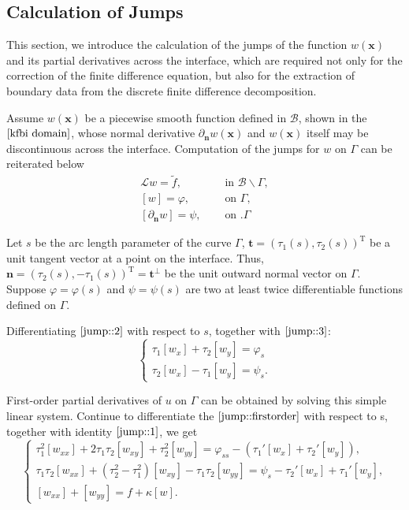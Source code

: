 \documentclass{article}
\begin{document}
\subsection{Calculation of Jumps}\label{appen:jumps}
This section, we introduce the calculation of the jumps of the function $w(\mathbf{x})$ and its partial derivatives across the interface, 
 which are required not only for the correction of the finite difference equation, but also for the extraction of boundary data from the discrete finite difference decomposition.
 
Assume $w(\mathbf{x})$ be a piecewise smooth function defined in $\mathcal{B}$, shown in the $\ref{kfbi domain}$, whose normal derivative $\partial_{\mathbf{n}} w(\mathbf{x})$ and $w(\mathbf{x})$ itself may be discontinuous across the interface. Computation of the jumps for $w$ on $\Gamma$ can be reiterated below
\begin{align}
\mathcal{L} w =\tilde{f}, & \quad \text { in }  \mathcal{B} \backslash \Gamma \label{jump::1},\\
[w] =\varphi, & \quad \text { on } \Gamma \label{jump::2},\\
\left[\partial_{\mathbf{n}}w\right] =\psi, & \quad \text { on } \label{jump::3}.\Gamma
\end{align}
\label{interface2}

Let $s$ be the arc length parameter of the curve $\Gamma$, $\mathbf{t}=(\tau_{1}(s), \tau_{2}(s))^{\mathrm{T}}$ be a unit tangent vector at a point on the interface. Thus, $\mathbf{n}=\left(\tau_{2}(s),-\tau_{1}(s)\right)^{\mathrm{T}}=\mathbf{t}^{\perp}$ be the unit outward normal vector on $\Gamma$. Suppose $\varphi = \varphi(s)$ and $\psi = \psi(s)$ are two at least twice differentiable functions defined on $\Gamma$.

Differentiating $\eqref{jump::2}$ with respect to $s$, together with $\eqref{jump::3}$:
\begin{equation}
    \begin{cases}
    \tau_{1}[w_{x}] + \tau_{2}[w_{y}] = \varphi_{s}\\
    \tau_{2}[w_{x}] - \tau_{1}[w_{y}] = \psi_{s} .
    \end{cases}
    \label{jump::firstorder}
\end{equation}

First-order partial derivatives of $u$ on $\Gamma$ can be obtained by solving this simple linear system. Continue to differentiate the $\eqref{jump::firstorder}$ with respect to s, together with identity $\eqref{jump::1}$, we get
\begin{equation}
    \begin{cases}
    \tau_{1}^{2}[w_{x x}] + 2\tau_{1}\tau_{2}[w_{x y}] + \tau_{2}^{2}[w_{y y}] = \varphi_{s s} - ( \tau_{1}'[w_{x}] + \tau_{2}'[w_{y}]),\\
    \tau_{1}\tau_{2}[w_{x x}] + (\tau_{2}^{2}-\tau_{1}^{2})[w_{x y}] - \tau_{1}\tau_{2}[w_{y y}] = \psi_{s} - \tau_{2}'[w_{x}] + \tau_{1}'[w_{y}],\\
    [w_{x x}] + [w_{y y}] = f + \kappa [w].
    \end{cases}
    \label{jump::secondorder}
\end{equation}
\end{document}
